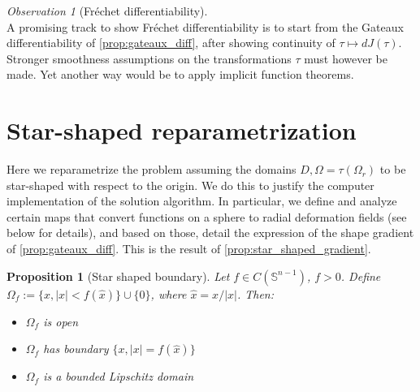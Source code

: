 \documentclass[english,a4paper,9pt,oneside]{scrbook}	%
\theoremstyle{break}
\newtheorem{prop}[equation]{Proposition}
\theoremstyle{remark}
\newtheorem{obs}[equation]{Observation}
\newcommand{\mS}{\mathbb{S}^{n-1}}
\newcommand{\xh}{\hat{x}}
\begin{document}
\begin{obs}[Fréchet differentiability]
\mbox{}\\
A promising track to show Fréchet differentiability is to start from the Gateaux differentiability of \cref{prop:gateaux_diff}, after showing continuity of $\tau\mapsto dJ(\tau)$. Stronger smoothness assumptions on the transformations $\tau$ must however be made. 
Yet another way would be to apply implicit function theorems.
\end{obs}

\section{Star-shaped reparametrization}
\label{sec:star}

Here we reparametrize the problem assuming the domains $D, \Omega=\tau(\Omega_r)$ to be star-shaped with respect to the origin. We do this to justify the computer implementation of the solution algorithm. In particular, we define and analyze certain maps that convert functions on a sphere to radial deformation fields (see below for details), and based on those, detail the expression of the shape gradient of \cref{prop:gateaux_diff}. This is the result of \cref{prop:star_shaped_gradient}.

\begin{prop}[Star shaped boundary]
Let $f \in C(\mS)$, $f>0$. Define $\Omega_f:=\{x, |x|<f(\xh)\}\cup\{0\}$, where $\xh=x/|x|$. Then:
\begin{itemize}
\item $\Omega_f$ is open
\item $\Omega_f$ has boundary $\{x, |x|=f(\xh)\}$
\item $\Omega_f$ is a bounded Lipschitz domain
\end{itemize}
\end{prop}
%
\end{document}
